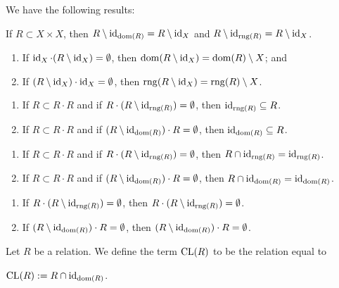 \documentclass{article}
\begin{document}
We have the following results:
\begin{thm}
\item\label{sysrel:20} If $R\subset X\times X$, then
  $R\setminus\operatorname{id}_{\operatorname{dom}(R)}=R\setminus\operatorname{id}_{X}$ and $R\setminus\operatorname{id}_{\operatorname{rng}(R)}=R\setminus\operatorname{id}_{X}$.
\item\label{sysrel:21}
  \begin{enumerate}[label=(\alph*)]
  \item If $\operatorname{id}_{X}\cdot(R\setminus\operatorname{id}_{X})=\emptyset$,
    then $\operatorname{dom}(R\setminus\operatorname{id}_{X})=\operatorname{dom}(R)\setminus X$; and
  \item If $(R\setminus\operatorname{id}_{X})\cdot\operatorname{id}_{X}=\emptyset$,
    then $\operatorname{rng}(R\setminus\operatorname{id}_{X})=\operatorname{rng}(R)\setminus X$.
  \end{enumerate}
\item\label{sysrel:22} 
  \begin{enumerate}[label=(\alph*)]
  \item If $R\subset R\cdot R$ and if $R\cdot(R\setminus\operatorname{id}_{\operatorname{rng}(R)})=\emptyset$,
    then $\operatorname{id}_{\operatorname{rng}(R)}\subseteq R$.
  \item If $R\subset R\cdot R$ and if $(R\setminus\operatorname{id}_{\operatorname{dom}(R)})\cdot R=\emptyset$,
    then $\operatorname{id}_{\operatorname{dom}(R)}\subseteq R$.
  \end{enumerate}
\item\label{sysrel:23} 
  \begin{enumerate}[label=(\alph*)]
  \item If $R\subset R\cdot R$ and if $R\cdot(R\setminus\operatorname{id}_{\operatorname{rng}(R)})=\emptyset$,
    then $R\cap\operatorname{id}_{\operatorname{rng}(R)}=\operatorname{id}_{\operatorname{rng}(R)}$.
  \item If $R\subset R\cdot R$ and if $(R\setminus\operatorname{id}_{\operatorname{dom}(R)})\cdot R=\emptyset$,
    then $R\cap\operatorname{id}_{\operatorname{dom}(R)}=\operatorname{id}_{\operatorname{dom}(R)}$.
  \end{enumerate}
\item\label{sysrel:24} 
  \begin{enumerate}[label=(\alph*)]
  \item If $R\cdot(R\setminus\operatorname{id}_{\operatorname{rng}(R)})=\emptyset$,
    then $R\cdot(R\setminus\operatorname{id}_{\operatorname{rng}(R)})=\emptyset$.
  \item If $(R\setminus\operatorname{id}_{\operatorname{dom}(R)})\cdot R=\emptyset$,
    then $(R\setminus\operatorname{id}_{\operatorname{dom}(R)})\cdot R=\emptyset$.
  \end{enumerate}
\end{thm}

\begin{definition}
Let $R$ be a relation.
We define the term $\operatorname{CL}(R)$ to be the relation equal to
\begin{defn}
\item $\operatorname{CL}(R):=R\cap\operatorname{id}_{\operatorname{dom}(R)}$.
\end{defn}
\end{definition}
\end{document}
